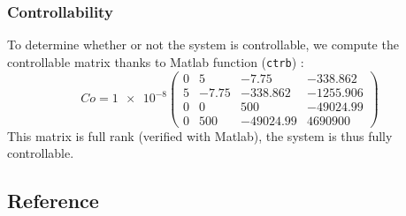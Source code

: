 \documentclass[a4paper, 12pt]{article}
\begin{document}
    \subsubsection{Controllability}
    To determine whether or not the system is controllable, we compute the controllable matrix thanks to Matlab function (\texttt{ctrb}) :
    \begin{equation*}
        Co = \num{1e-8}\begin{pmatrix}
            0 & 5 & \num{-7.75} & \num{-338.862}\\
            5 & \num{-7.75} & \num{-338.862} & \num{-1255.906}\\
            0 & 0 & \num{500} & \num{-49024.99}\\
            0 & \num{500} & \num{-49024.99} & \num{4690900}
        \end{pmatrix}
    \end{equation*}
    This matrix is full rank (verified with Matlab), the system is thus fully controllable.
    
    \newpage
    \subsection{Reference}
    \nocite{*}
    \printbibliography
\end{document}
